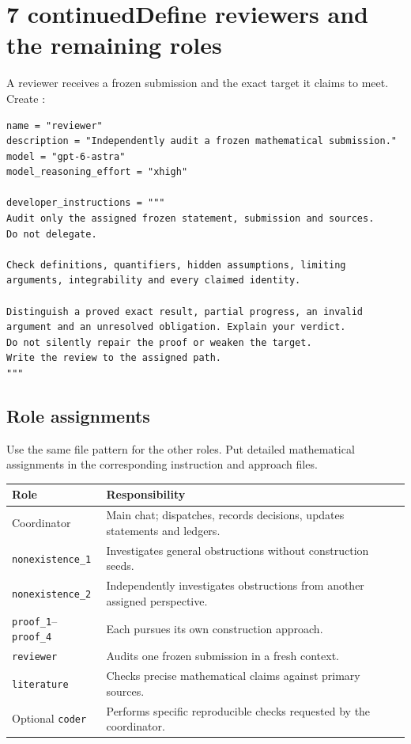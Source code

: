 \documentclass[11pt,a4paper]{article}
\newcommand{\pathcode}[1]{\texttt{\small\detokenize{#1}}}
\newcommand{\step}[2]{\section*{#1\quad #2}}
\begin{document}
\step{7 continued}{Define reviewers and the remaining roles}
A reviewer receives a frozen submission and the exact target it claims to meet. Create \pathcode{.codex/agents/reviewer.toml}:
\begin{lstlisting}
name = "reviewer"
description = "Independently audit a frozen mathematical submission."
model = "gpt-6-astra"
model_reasoning_effort = "xhigh"

developer_instructions = """
Audit only the assigned frozen statement, submission and sources.
Do not delegate.

Check definitions, quantifiers, hidden assumptions, limiting
arguments, integrability and every claimed identity.

Distinguish a proved exact result, partial progress, an invalid
argument and an unresolved obligation. Explain your verdict.
Do not silently repair the proof or weaken the target.
Write the review to the assigned path.
"""
\end{lstlisting}

\subsection*{Role assignments}
Use the same file pattern for the other roles. Put detailed mathematical assignments in the corresponding instruction and approach files.

\renewcommand{\arraystretch}{1.22}
\begin{tabularx}{\linewidth}{@{}p{36mm}Y@{}}
\toprule
\textbf{Role} & \textbf{Responsibility}\\
\midrule
Coordinator & Main chat; dispatches, records decisions, updates statements and ledgers.\\
\texttt{nonexistence\_1} & Investigates general obstructions without construction seeds.\\
\texttt{nonexistence\_2} & Independently investigates obstructions from another assigned perspective.\\
\texttt{proof\_1}--\texttt{proof\_4} & Each pursues its own construction approach.\\
\texttt{reviewer} & Audits one frozen submission in a fresh context.\\
\texttt{literature} & Checks precise mathematical claims against primary sources.\\
Optional \texttt{coder} & Performs specific reproducible checks requested by the coordinator.\\
\bottomrule
\end{tabularx}
\end{document}
